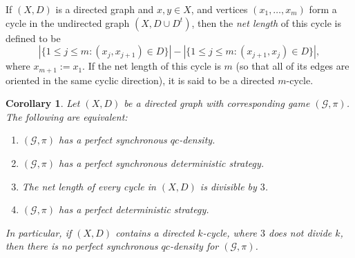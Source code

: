 \documentclass[11pt]{amsart}
\newtheorem{cor}[thm]{Corollary}
\theoremstyle{definition}
\newcommand{\cl}[1]{\mathcal{#1}}
\begin{document}
   If $(X,D)$ is a directed graph and $x, y\in X$, and vertices $(x_1,\dots,x_m)$ form a cycle in the undirected graph $(X,D\cup D^t)$, then the \emph{net length} of this cycle is defined to be
   \[
     |\{1\le j\le m:(x_j,x_{j+1})\in D\}|-|\{1\le j\le m:(x_{j+1},x_j)\in D\}|,
   \] where $x_{m+1}:=x_1$. If the net length of this cycle is $m$ (so
   that all of its edges are oriented in the same cyclic direction), it is
   said to be a directed $m$-cycle.
   \begin{cor}\label{cor:directed}
     Let $(X,D)$ be a directed graph with corresponding game $(\cl G,\pi)$. The following are equivalent:
     \begin{enumerate}
     \item $(\cl G,\pi)$ has a perfect synchronous $qc$-density.
     \item $(\cl G,\pi)$ has a perfect synchronous deterministic strategy.
     \item The net length of every cycle in $(X,D)$ is divisible by $3$.
     \item $(\cl G,\pi)$ has a perfect deterministic strategy.
     \end{enumerate}
     In particular, if $(X,D)$ contains a directed $k$-cycle, where $3$ does not divide $k$, then there is no perfect synchronous $qc$-density for $(\cl G,\pi)$.
   \end{cor}
\end{document}
